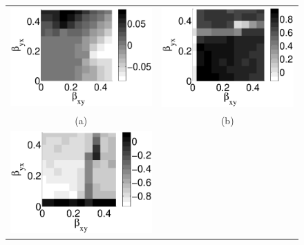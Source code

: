 \documentclass[twocolumn,aps,pre,groupedaddress]{revtex4-1}
\begin{document}
\begin{figure}[ht]
\begin{tabular}{cc}
\includegraphics[scale=0.34]{CoupLogexample_rx35ry35.eps} &
\includegraphics[scale=0.34]{CoupLogexample_rx40ry20.eps} \\
(a) & (b) \\
\includegraphics[scale=0.34]{CoupLogexample_rx20ry40.eps} &

\end{tabular}
\end{figure}
\end{document}
